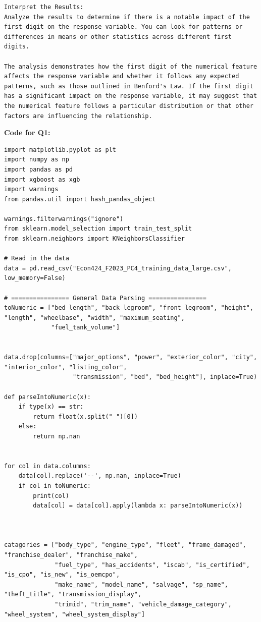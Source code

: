 \documentclass{article}
\begin{document}
\begin{titlepage}
\begin{verbatim}
Interpret the Results:
Analyze the results to determine if there is a notable impact of the first digit on the response variable. You can look for patterns or differences in means or other statistics across different first digits.

The analysis demonstrates how the first digit of the numerical feature affects the response variable and whether it follows any expected patterns, such as those outlined in Benford's Law. If the first digit has a significant impact on the response variable, it may suggest that the numerical feature follows a particular distribution or that other factors are influencing the relationship.
\end{verbatim}
\end{titlepage}
\textbf{Code for Q1:}
\begin{lstlisting}
import matplotlib.pyplot as plt
import numpy as np
import pandas as pd
import xgboost as xgb
import warnings
from pandas.util import hash_pandas_object

warnings.filterwarnings("ignore")
from sklearn.model_selection import train_test_split
from sklearn.neighbors import KNeighborsClassifier

# Read in the data
data = pd.read_csv("Econ424_F2023_PC4_training_data_large.csv", low_memory=False)

# ================ General Data Parsing ================
toNumeric = ["bed_length", "back_legroom", "front_legroom", "height", "length", "wheelbase", "width", "maximum_seating",
             "fuel_tank_volume"]


data.drop(columns=["major_options", "power", "exterior_color", "city", "interior_color", "listing_color",
                   "transmission", "bed", "bed_height"], inplace=True)

def parseIntoNumeric(x):
    if type(x) == str:
        return float(x.split(" ")[0])
    else:
        return np.nan


for col in data.columns:
    data[col].replace('--', np.nan, inplace=True)
    if col in toNumeric:
        print(col)
        data[col] = data[col].apply(lambda x: parseIntoNumeric(x))



catagories = ["body_type", "engine_type", "fleet", "frame_damaged", "franchise_dealer", "franchise_make",
              "fuel_type", "has_accidents", "iscab", "is_certified", "is_cpo", "is_new", "is_oemcpo",
              "make_name", "model_name", "salvage", "sp_name", "theft_title", "transmission_display",
              "trimid", "trim_name", "vehicle_damage_category", "wheel_system", "wheel_system_display"]


\end{lstlisting}
\end{document}
